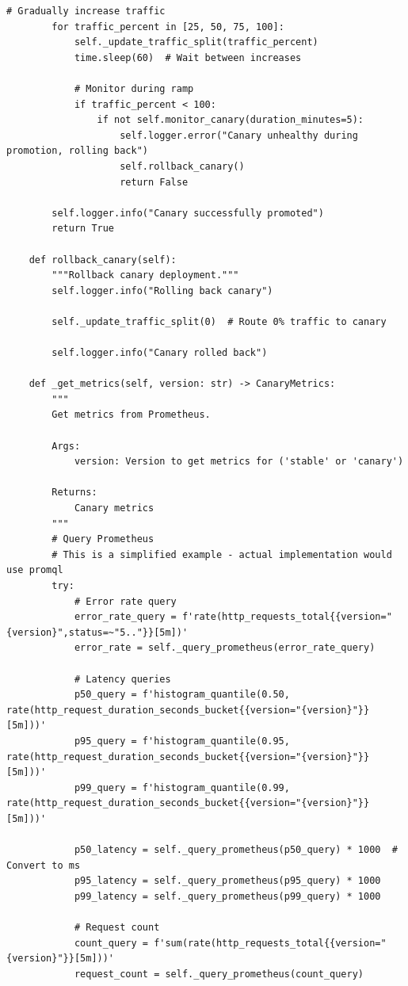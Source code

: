 \begin{lstlisting}[style=python, caption={Canary Deployment Controller}]
        # Gradually increase traffic
        for traffic_percent in [25, 50, 75, 100]:
            self._update_traffic_split(traffic_percent)
            time.sleep(60)  # Wait between increases

            # Monitor during ramp
            if traffic_percent < 100:
                if not self.monitor_canary(duration_minutes=5):
                    self.logger.error("Canary unhealthy during promotion, rolling back")
                    self.rollback_canary()
                    return False

        self.logger.info("Canary successfully promoted")
        return True

    def rollback_canary(self):
        """Rollback canary deployment."""
        self.logger.info("Rolling back canary")

        self._update_traffic_split(0)  # Route 0% traffic to canary

        self.logger.info("Canary rolled back")

    def _get_metrics(self, version: str) -> CanaryMetrics:
        """
        Get metrics from Prometheus.

        Args:
            version: Version to get metrics for ('stable' or 'canary')

        Returns:
            Canary metrics
        """
        # Query Prometheus
        # This is a simplified example - actual implementation would use promql
        try:
            # Error rate query
            error_rate_query = f'rate(http_requests_total{{version="{version}",status=~"5.."}}[5m])'
            error_rate = self._query_prometheus(error_rate_query)

            # Latency queries
            p50_query = f'histogram_quantile(0.50, rate(http_request_duration_seconds_bucket{{version="{version}"}}[5m]))'
            p95_query = f'histogram_quantile(0.95, rate(http_request_duration_seconds_bucket{{version="{version}"}}[5m]))'
            p99_query = f'histogram_quantile(0.99, rate(http_request_duration_seconds_bucket{{version="{version}"}}[5m]))'

            p50_latency = self._query_prometheus(p50_query) * 1000  # Convert to ms
            p95_latency = self._query_prometheus(p95_query) * 1000
            p99_latency = self._query_prometheus(p99_query) * 1000

            # Request count
            count_query = f'sum(rate(http_requests_total{{version="{version}"}}[5m]))'
            request_count = self._query_prometheus(count_query)


\end{lstlisting}
